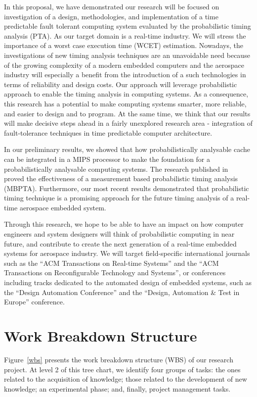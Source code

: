  

In this proposal, we have demonstrated our research will be focused on investigation of a design, methodologies, and implementation of a time predictable fault tolerant computing system evaluated by the probabilistic timing analysis (PTA). As our target domain is a real-time industry. We will stress the importance of a worst case execution time (WCET) estimation.
Nowadays, the investigations of new timing analysis techniques are an unavoidable need because of the growing complexity of a modern embedded computers and the aerospace industry will especially a benefit from the introduction of a such technologies in terms of  reliability and design costs. Our approach will leverage probabilistic approach to enable the timing analysis in computing systems.
As a consequence, this research has a potential to make computing systems smarter, more reliable, and easier to design and to program. At the same time, we think that our results will make decisive steps ahead in a fairly unexplored research area - integration of fault-tolerance techniques in time predictable computer architecture.


In our preliminary results, we showed that how probabilistically analysable cache can be integrated in a MIPS processor to make the foundation for a probabilistically analysable computing systems. The research published in~\cite{NEWCAS} proved the effectiveness of a measurement based probabilistic timing analysis (MBPTA). Furthermore, our most recent results demonstrated that probabilistic timing technique is a promising approach for the future timing analysis of a real-time aerospace embedded system.

Through this research, we hope to be able to have an impact on how computer engineers and system designers will think of probabilistic computing in near future, and contribute to create the next generation of a real-time embedded systems for aerospace industry.
We will target field-specific international  journals such as the ``ACM Transactions on Real-time  Systems'' and the ``ACM Transactions on Reconfigurable Technology and Systems'', or conferences including tracks dedicated to the automated design of embedded systems, such as the ``Design Automation Conference'' and the ``Design, Automation \& Test in Europe'' conference.

\section{Work Breakdown Structure}
Figure~\ref{wbs} presents the work breakdown structure (WBS) of our research project. At level 2 of this tree chart, we identify four groups of tasks: the ones related to the acquisition of knowledge; those related to the development of new knowledge; an experimental phase; and, finally, project management tasks.

